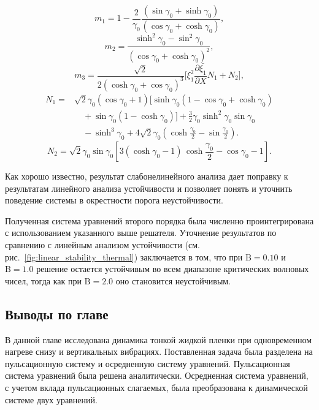 \documentclass[12pt,a4paper]{article}
\begin{document}
\begin{equation*}
	m_1 = 1 - \frac{2}{ \gamma_0} \frac{(\sin \gamma_0 + \sinh \gamma_0)}{(\cos \gamma_0 + \cosh \gamma_0)},
\end{equation*}
\begin{equation*}
	m_2 = \frac{\sinh^2 \gamma_0 - \sin^2 \gamma_0}{(\cos \gamma_0 + \cosh \gamma_0)^2},
\end{equation*}
\begin{equation*}
	m_3= \frac{\sqrt{2}}{2 (\cosh\gamma_0+\cos\gamma_0)^3}
	\Big[\xi_1^2  \frac{\partial \bar{\xi_1}}{\partial X} N_1+N_2\Big],
\end{equation*}
\begin{equation*}
	\begin{aligned}
		N_1={}&
		\sqrt{2}\gamma_0(\cos\gamma_0+1)
		\Big[\sinh\gamma_0
		(1-\cos\gamma_0+\cosh\gamma_0)\\
		&\quad+\sin\gamma_0(1-\cosh\gamma_0)\Big]
		+\frac{3}{2}\gamma_0\sinh^2\gamma_0\sin\gamma_0\\
		&\quad-\sinh^3\gamma_0
		+4\sqrt{2}\gamma_0
		\left(\cosh\frac{\gamma_0}{2}
		-\sin\frac{\gamma_0}{2}\right).
	\end{aligned}
\end{equation*}
\begin{equation*}
	N_2=\sqrt{2}\gamma_0\sin\gamma_0\left[3(\cosh\gamma_0-1)\,\cosh\frac{\gamma_0}{2} - \cos\gamma_0 - 1\right].
\end{equation*}


Как хорошо известно, результат слабонелинейного анализа дает поправку к результатам линейного анализа устойчивости и позволяет понять и уточнить поведение системы в окрестности порога неустойчивости.

Полученная система уравнений второго порядка была численно проинтегрирована с использованием указанного выше решателя. Уточнение результатов по сравнению с линейным анализом устойчивости (см. рис.~\ref{fig:linear_stability_thermal}) заключается в том, что при $\mathrm{B}=0.10$ и $\mathrm{B}=1.0$ решение остается устойчивым во всем диапазоне критических волновых чисел, тогда как при $\mathrm{B}=2.0$ оно становится неустойчивым.

\subsection{Выводы по главе}

В данной главе исследована динамика тонкой жидкой пленки при одновременном нагреве снизу и вертикальных вибрациях. Поставленная задача была разделена на пульсационную систему и осредненную систему уравнений. Пульсационная система уравнений была решена аналитически. Осредненная система уравнений, с учетом вклада пульсационных слагаемых, была преобразована к динамической системе двух уравнений. 
\end{document}
